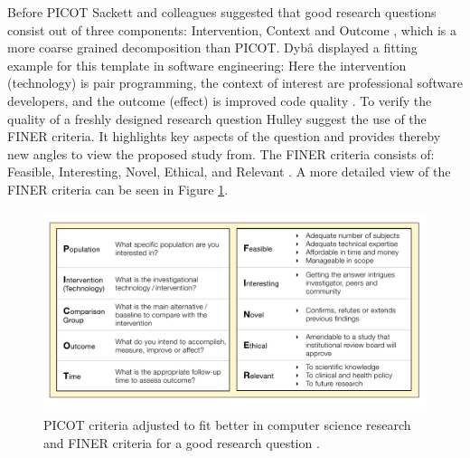Before PICOT Sackett and colleagues suggested that good research questions consist out of three components: Intervention, Context and Outcome \cite{Sackett2000}, which is a more coarse grained decomposition than PICOT. Dyb{\aa} \etal displayed a fitting example for this template in software engineering:  \cite[p. 60]{Dyba2005} Here the intervention (technology) is pair programming, the context of interest are professional software developers, and the outcome (effect) is improved code quality \cite{Dyba2005}. To verify the quality of a freshly designed research question Hulley \etal suggest the use of the FINER criteria. It highlights key aspects of the question and provides thereby new angles to view the proposed study from. The FINER criteria consists of: Feasible, Interesting, Novel, Ethical, and Relevant \cite{Farrugia2009}. A more detailed view of the FINER criteria can be seen in Figure \ref{fig:PICOT_FINER}.   

\begin{figure}
	\centering
	\includegraphics[width=12cm]{figures/picot_finer.pdf}
	\caption{PICOT criteria adjusted to fit better in computer science research \cite{Farrugia2009} and FINER criteria for a good research question \cite{Farrugia2009}.}
	\label{fig:PICOT_FINER}
\end{figure}

